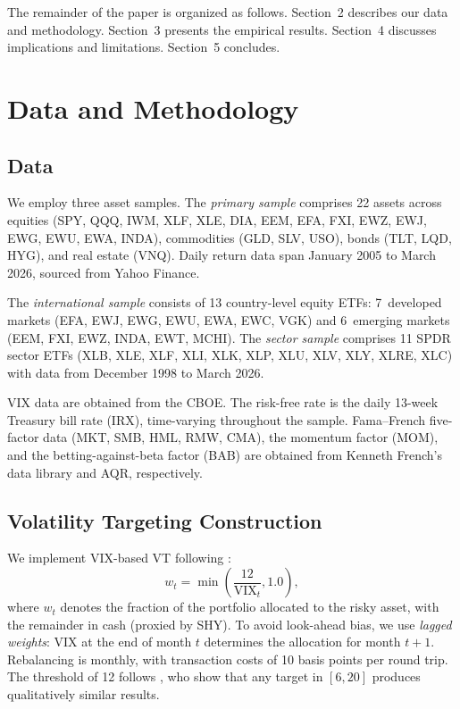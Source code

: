 The remainder of the paper is organized as follows. Section~2 describes our data and methodology. Section~3 presents the empirical results. Section~4 discusses implications and limitations. Section~5 concludes.


\section{Data and Methodology}

\subsection{Data}

We employ three asset samples. The \textit{primary sample} comprises 22 assets across equities (SPY, QQQ, IWM, XLF, XLE, DIA, EEM, EFA, FXI, EWZ, EWJ, EWG, EWU, EWA, INDA), commodities (GLD, SLV, USO), bonds (TLT, LQD, HYG), and real estate (VNQ). Daily return data span January 2005 to March 2026, sourced from Yahoo Finance.

The \textit{international sample} consists of 13 country-level equity ETFs: 7~developed markets (EFA, EWJ, EWG, EWU, EWA, EWC, VGK) and 6~emerging markets (EEM, FXI, EWZ, INDA, EWT, MCHI). The \textit{sector sample} comprises 11 SPDR sector ETFs (XLB, XLE, XLF, XLI, XLK, XLP, XLU, XLV, XLY, XLRE, XLC) with data from December 1998 to March 2026.

VIX data are obtained from the CBOE. The risk-free rate is the daily 13-week Treasury bill rate (IRX), time-varying throughout the sample. Fama--French five-factor data (MKT, SMB, HML, RMW, CMA), the momentum factor (MOM), and the betting-against-beta factor (BAB) are obtained from Kenneth French's data library and AQR, respectively.

\subsection{Volatility Targeting Construction}

We implement VIX-based VT following \citet{bozovic2024}:
\begin{equation}
w_t = \min\!\left(\frac{12}{\text{VIX}_t}, 1.0\right),
\label{eq:vt_weight}
\end{equation}
where $w_t$ denotes the fraction of the portfolio allocated to the risky asset, with the remainder in cash (proxied by SHY). To avoid look-ahead bias, we use \textit{lagged weights}: VIX at the end of month $t$ determines the allocation for month $t+1$. Rebalancing is monthly, with transaction costs of 10 basis points per round trip. The threshold of 12 follows \citet{lai2026a}, who show that any target in $[6, 20]$ produces qualitatively similar results.

